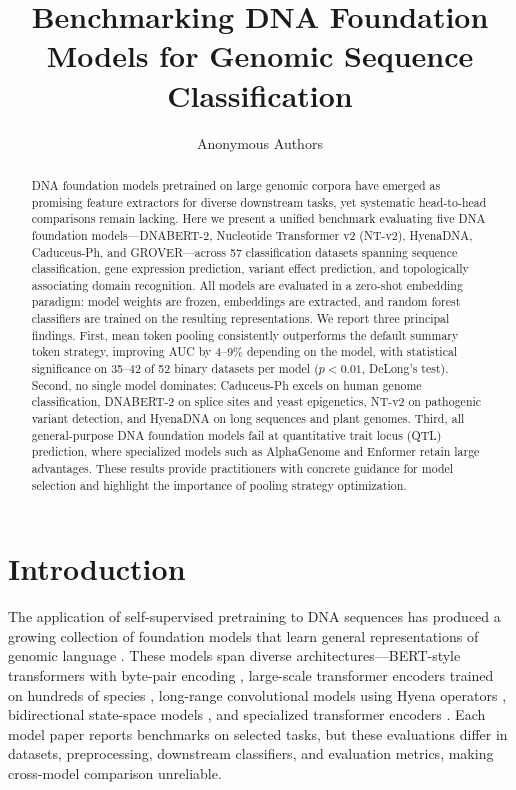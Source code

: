 \documentclass[11pt]{article}
\title{Benchmarking DNA Foundation Models for Genomic Sequence Classification}
\author{Anonymous Authors}
\date{}
\begin{document}
\maketitle

\begin{abstract}
DNA foundation models pretrained on large genomic corpora have emerged as promising feature extractors for diverse downstream tasks, yet systematic head-to-head comparisons remain lacking. Here we present a unified benchmark evaluating five DNA foundation models---DNABERT-2, Nucleotide Transformer v2 (NT-v2), HyenaDNA, Caduceus-Ph, and GROVER---across 57 classification datasets spanning sequence classification, gene expression prediction, variant effect prediction, and topologically associating domain recognition. All models are evaluated in a zero-shot embedding paradigm: model weights are frozen, embeddings are extracted, and random forest classifiers are trained on the resulting representations. We report three principal findings. First, mean token pooling consistently outperforms the default summary token strategy, improving AUC by 4--9\% depending on the model, with statistical significance on 35--42 of 52 binary datasets per model ($p < 0.01$, DeLong's test). Second, no single model dominates: Caduceus-Ph excels on human genome classification, DNABERT-2 on splice sites and yeast epigenetics, NT-v2 on pathogenic variant detection, and HyenaDNA on long sequences and plant genomes. Third, all general-purpose DNA foundation models fail at quantitative trait locus (QTL) prediction, where specialized models such as AlphaGenome and Enformer retain large advantages. These results provide practitioners with concrete guidance for model selection and highlight the importance of pooling strategy optimization.
\end{abstract}

\section{Introduction}

The application of self-supervised pretraining to DNA sequences has produced a growing collection of foundation models that learn general representations of genomic language \citep{ji2021dnabert, zhou2023dnabert2, dallatorre2023nucleotide}. These models span diverse architectures---BERT-style transformers with byte-pair encoding \citep{zhou2023dnabert2}, large-scale transformer encoders trained on hundreds of species \citep{dallatorre2023nucleotide}, long-range convolutional models using Hyena operators \citep{nguyen2024hyenadna}, bidirectional state-space models \citep{schiff2024caduceus}, and specialized transformer encoders \citep{sanabria2024grover}. Each model paper reports benchmarks on selected tasks, but these evaluations differ in datasets, preprocessing, downstream classifiers, and evaluation metrics, making cross-model comparison unreliable.
\end{document}
